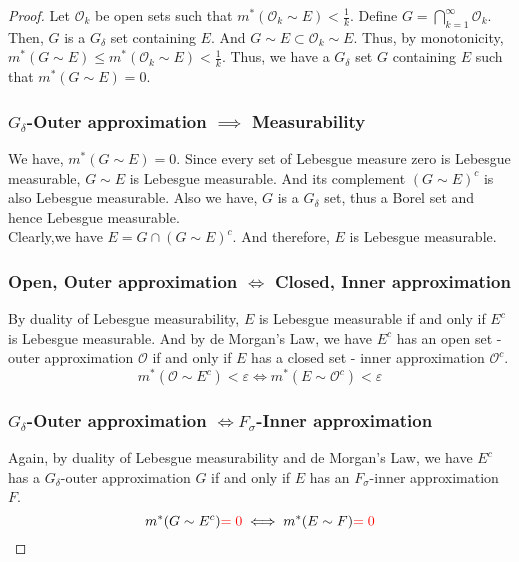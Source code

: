 \begin{proof}
	Let $\mathcal{O}_k$ be open sets such that $m^\ast(\mathcal{O}_k \sim E) < \frac{1}{k}$.
	Define $\displaystyle G = \bigcap_{k=1}^\infty \mathcal{O}_k$.
	Then, $G$ is a $G_\delta$ set containing $E$.
	And $G \sim E \subset \mathcal{O}_k \sim E$.
	Thus, by monotonicity, $m^\ast(G \sim E) \le m^\ast(\mathcal{O}_k \sim E) < \frac{1}{k}$.
	Thus, we have a $G_\delta$ set $G$ containing $E$ such that $m^\ast(G \sim E) = 0$.

\subsubsection*{$G_\delta$-Outer approximation $\implies$ Measurability}
	We have, $m^\ast(G \sim  E) = 0$.
	Since every set of Lebesgue measure zero is Lebesgue measurable, $G \sim E$ is Lebesgue measurable.
	And its complement $(G \sim E)^c$ is also Lebesgue measurable.
	Also we have, $G$ is a $G_\delta$ set, thus a Borel set and hence Lebesgue measurable.\\

	Clearly,we have $E = G \cap (G \sim E)^c$.
	And therefore, $E$ is Lebesgue measurable.

\subsubsection*{Open, Outer approximation $\iff$ Closed, Inner approximation}
	By duality of Lebesgue measurability, $E$ is Lebesgue measurable if and only if $E^c$ is Lebesgue measurable.
	And by de Morgan's Law, we have $E^c$ has an open set - outer approximation $\mathcal{O}$ if and only if $E$ has a closed set - inner approximation $\mathcal{O}^c$.
	\[ m^\ast(\mathcal{O} \sim E^c) < \varepsilon \iff m^\ast(E \sim \mathcal{O}^c) < \varepsilon \]

\subsubsection*{$G_\delta$-Outer approximation $\iff F_\sigma$-Inner approximation}
	Again, by duality of Lebesgue measurability and de Morgan's Law, we have $E^c$ has a $G_\delta$-outer approximation $G$ if and only if $E$ has an $F_\sigma$-inner approximation $F$.
	\[ m^\ast(G \sim E^c) {\color{red}= 0} \iff m^\ast(E \sim F){\color{red} = 0} \]
\end{proof}

